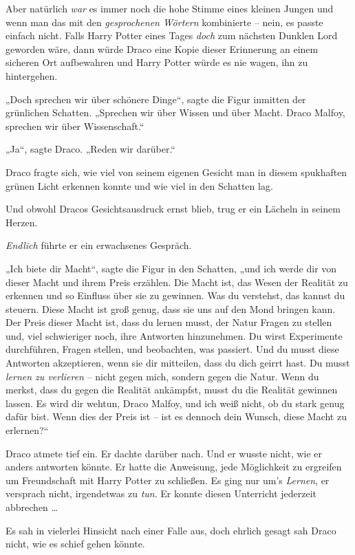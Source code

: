 Aber natürlich \emph{war} es immer noch die hohe Stimme eines kleinen Jungen und wenn man das mit den \emph{gesprochenen Wörtern} kombinierte – nein, es passte einfach nicht. Falls Harry Potter eines Tages \emph{doch} zum nächsten Dunklen Lord geworden wäre, dann würde Draco eine Kopie dieser Erinnerung an einem sicheren Ort aufbewahren und Harry Potter würde es nie wagen, ihn zu hintergehen. 

„Doch sprechen wir über schönere Dinge“, sagte die Figur inmitten der grünlichen Schatten. „Sprechen wir über Wissen und über Macht. Draco Malfoy, sprechen wir über Wissenschaft.“

„Ja“, sagte Draco. „Reden wir darüber.“ 

Draco fragte sich, wie viel von seinem eigenen Gesicht man in diesem spukhaften grünen Licht erkennen konnte und wie viel in den Schatten lag. 

Und obwohl Dracos Gesichtsausdruck ernst blieb, trug er ein Lächeln in seinem Herzen. 

\emph{Endlich} führte er ein erwachsenes Gespräch. 

„Ich biete dir Macht“, sagte die Figur in den Schatten, „und ich werde dir von dieser Macht und ihrem Preis erzählen. Die Macht ist, das Wesen der Realität zu erkennen und so Einfluss über sie zu gewinnen. Was du verstehst, das kannst du steuern. Diese Macht ist groß genug, dass sie uns auf den Mond bringen kann. Der Preis dieser Macht ist, dass du lernen musst, der Natur Fragen zu stellen und, viel schwieriger noch, ihre Antworten hinzunehmen. Du wirst Experimente durchführen, Fragen stellen, und beobachten, was passiert. Und du musst diese Antworten akzeptieren, wenn sie dir mitteilen, dass du dich geirrt hast. Du musst \emph{lernen zu verlieren} – nicht gegen mich, sondern gegen die Natur. Wenn du merkst, dass du gegen die Realität ankämpfst, musst du die Realität gewinnen lassen. Es wird dir wehtun, Draco Malfoy, und ich weiß nicht, ob du stark genug dafür bist. Wenn dies der Preis ist – ist es dennoch dein Wunsch, diese Macht zu erlernen?“ 

Draco atmete tief ein. Er dachte darüber nach. Und er wusste nicht, wie er anders antworten könnte. Er hatte die Anweisung, jede Möglichkeit zu ergreifen um Freundschaft mit Harry Potter zu schließen. Es ging nur um’s \emph{Lernen}, er versprach nicht, irgendetwas zu \emph{tun}. Er konnte diesen Unterricht jederzeit abbrechen … 

Es sah in vielerlei Hinsicht nach einer Falle aus, doch ehrlich gesagt sah Draco nicht, wie es schief gehen könnte. 

